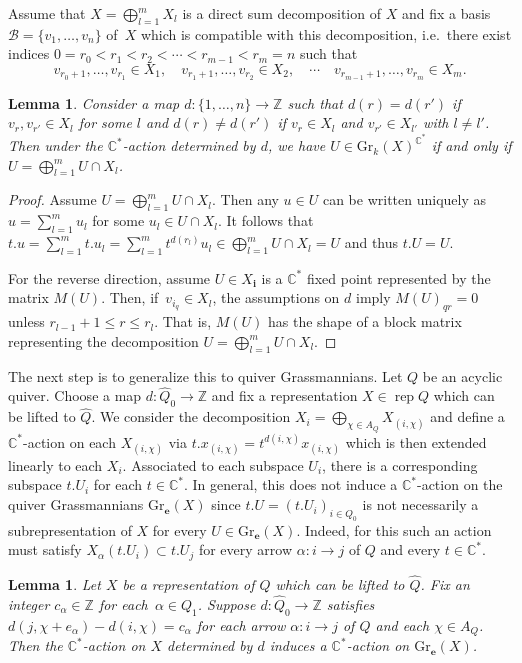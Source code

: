 \documentclass{amsart}
\newtheorem{lemma}[theorem]{Lemma}
\numberwithin{equation}{section}
\newcommand{\C}{\mathbb{C}}
\newcommand{\CC}{\mathbb{C}}
\newcommand{\ZZ}{\mathbb{Z}}
\newcommand{\bfe}{\mathbf{e}}
\newcommand{\bfi}{\mathbf{i}}
\newcommand{\Gr}{\mathrm{Gr}}
\newcommand{\rep}{\operatorname{rep}}
\begin{document}
Assume that $X=\bigoplus_{l=1}^m X_l$ is a direct sum decomposition of $X$ and fix a basis $\mathcal B=\{v_1,\ldots,v_n\}$ of~$X$ which is compatible with this decomposition, i.e.\ there exist indices $0=r_0<r_1<r_2<\cdots<r_{m-1}<r_m=n$ such that
\[v_{r_0+1},\ldots,v_{r_1}\in X_1,\quad v_{r_1+1},\ldots,v_{r_2}\in X_2,\quad\cdots\quad v_{r_{m-1}+1},\ldots,v_{r_m}\in X_m.\]
\begin{lemma}
  \label{le:usualGrass}
  Consider a map $d:\{1,\ldots,n\}\to\ZZ$ such that $d(r)=d(r')$ if $v_r,v_{r'}\in X_l$ for some $l$ and $d(r)\neq d(r')$ if $v_r\in X_l$ and $v_{r'}\in X_{l'}$ with $l\neq l'$.
  Then under the $\CC^*$-action determined by $d$, we have $U\in\Gr_k(X)^{\C^\ast}$ if and only if $U=\bigoplus_{l=1}^m U\cap X_l$.
\end{lemma}
\begin{proof}
  Assume $U=\bigoplus_{l=1}^m U\cap X_l$.
  Then any $u\in U$ can be written uniquely as $u=\sum_{l=1}^m u_l$ for some $u_l\in U\cap X_l$.
  It follows that $t.u=\sum_{l=1}^m t.u_l=\sum_{l=1}^m t^{d(r_l)}u_l\in\bigoplus_{l=1}^m U\cap X_l=U$ and thus $t.U=U$. 

  For the reverse direction, assume $U\in X_{\bfi}$ is a $\CC^*$ fixed point represented by the matrix $M(U)$.
  Then, if~$v_{i_q}\in X_l$, the assumptions on $d$ imply $M(U)_{qr}=0$ unless $r_{l-1}+1\le r\le r_l$.
  That is, $M(U)$ has the shape of a block matrix representing the decomposition $U=\bigoplus_{l=1}^m U\cap X_l$.
\end{proof}
The next step is to generalize this to quiver Grassmannians.
Let $Q$ be an acyclic quiver.
Choose a map $d:\hat Q_0\to\ZZ$ and fix a representation $X\in\rep Q$ which can be lifted to $\hat Q$.
We consider the decomposition $X_i=\bigoplus_{\chi\in A_Q} X_{(i,\chi)}$ and define a $\CC^*$-action on each $X_{(i,\chi)}$ via $t.x_{(i,\chi)}=t^{d(i,\chi)}x_{(i,\chi)}$ which is then extended linearly to each $X_i$.
Associated to each subspace $U_i$, there is a corresponding subspace $t.U_i$ for each $t\in\CC^*$.
In general, this does not induce a $\CC^*$-action on the quiver Grassmannians $\Gr_\bfe(X)$ since $t.U=(t.U_i)_{i\in Q_0}$ is not necessarily a subrepresentation of $X$ for every $U\in\Gr_\bfe(X)$.
Indeed, for this such an action must satisfy $X_\alpha(t.U_i)\subset t.U_j$ for every arrow $\alpha:i\to j$ of $Q$ and every $t\in\CC^*$. 
\begin{lemma}
  Let $X$ be a representation of $Q$ which can be lifted to $\hat Q$.
  Fix an integer $c_\alpha\in\ZZ$ for each~$\alpha\in Q_1$.
  Suppose $d:\hat Q_0\to\ZZ$ satisfies $d(j,\chi+e_\alpha)-d(i,\chi)=c_\alpha$ for each arrow $\alpha:i\to j$ of $Q$ and each $\chi\in A_Q$.
  Then the $\CC^*$-action on $X$ determined by $d$ induces a $\CC^*$-action on $\Gr_\bfe(X)$.
\end{lemma}
\end{document}
